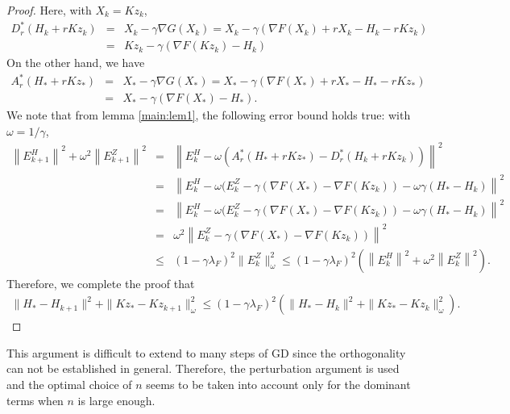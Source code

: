 \begin{proof} 
Here, with $X_k = Kz_k$, 
\begin{eqnarray*}
D_r^*( H_k + rKz_k) &=& X_k - \gamma \nabla G(X_k) = X_k - \gamma (\nabla F(X_k) + rX_k - H_k - rKz_k) \\&=& Kz_k - \gamma (\nabla F(Kz_k) - H_k) %
\end{eqnarray*}
On the other hand, we have 
\begin{eqnarray*}
A_r^*(H_* + rKz_*) &=& X_* - \gamma \nabla G(X_*) = X_* - \gamma (\nabla F(X_*) + rX_* - H_* - rKz_*) \\
&=& X_* - \gamma (\nabla F(X_*) - H_*). 
\end{eqnarray*}
We note that from lemma \ref{main:lem1}, the following error bound holds true: with $\omega = 1/\gamma$,
\begin{eqnarray*}
\left \|E_{k+1}^H \right \|^2 + \omega^2 \left \|E_{k+1}^Z \right \|^2 &=& \left \|E_k^H - \omega (A_r^{*} (H_* + r K z_*) - D_r^{*} (H_k + r K z_k)) \right \|^2 \\
&=& \left \|E_k^H - \omega (E_k^Z -\gamma (\nabla F(X_*) - \nabla F(Kz_k)) - \omega \gamma (H_* - H_k)  \right \|^2 \\
&=& \left \|E_k^H - \omega (E_k^Z -\gamma (\nabla F(X_*) - \nabla F(Kz_k)) - \omega \gamma (H_* - H_k)  \right \|^2 \\
&=& \omega^2 \left \|E_k^Z - \gamma (\nabla F(X_*) - \nabla F(Kz_k)) \right \|^2 \\ 
&\leq& (1 - \gamma \lambda_F)^2 \|E_k^Z\|_\omega^2 \leq (1 - \gamma \lambda_F)^2 \left ( \left \|E_{k}^H \right \|^2 + \omega^2 \left \|E_{k}^Z \right \|^2 \right ).
\end{eqnarray*}
Therefore, we complete the proof that 
\begin{eqnarray*}
\|H_{*} - H_{k+1}\|^2 + \|Kz_* - Kz_{k+1}\|^2_{\omega} \leq (1 - \gamma \lambda_F)^2 \left( \|H_* - H_k\|^2 + \|Kz_* - Kz_k\|^2_\omega \right ).
\end{eqnarray*}
\end{proof}
\begin{remark}
This argument is difficult to extend to many steps of GD since the orthogonality can not be established in general. Therefore, the perturbation argument is used and the optimal choice of $n$ seems to be taken into account only for the dominant terms when $n$ is large enough. 
\end{remark}

